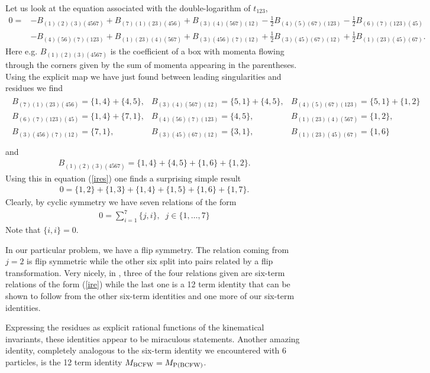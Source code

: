 \documentclass[12pt]{article}
\newcommand{\be}{\begin{eqnarray}}
\newcommand{\ee}{\end{eqnarray}}
\begin{document}
Let us look at the equation associated with the double-logarithm of $t_{123}$,
%
\begin{eqnarray}
\label{ires}
0 = & -B_{(1)(2)(3)(4567)} + B_{(7)(1)(23)(456)} + B_{(3)(4)(567)(12)} -\frac{1}{2}B_{(4)(5)(67)(123)} -\frac{1}{2}B_{(6)(7)(123)(45)} \\ & -B_{(4)(56)(7)(123)} + B_{(1)(23)(4)(567)} + B_{(3)(456)(7)(12)} +\frac{1}{2} B_{(3)(45)(67)(12)} + \frac{1}{2} B_{(1)(23)(45)(67)}. \nonumber
\end{eqnarray}
Here e.g. $B_{(1)(2)(3)(4567)}$ is the coefficient of a box with momenta flowing through the corners given by the sum of momenta appearing in the parentheses. Using the explicit map we have just found between leading singularities and residues we find
%
\be\nonumber
\begin{array}{ccc}
B_{(7)(1)(23)(456)} = \{1,4\}+\{4,5\}, & \!\!\! B_{(3)(4)(567)(12)} = \! \{5,1\}+\{4,5\}, & \!\!\! B_{(4)(5)(67)(123)} =\! \{5,1\}+\{1,2\}\\
B_{(6)(7)(123)(45)}=\{1,4\}+\{7,1\}, & B_{(4)(56)(7)(123)} = \{4,5\}, & B_{(1)(23)(4)(567)}= \{ 1,2\},\\
B_{(3)(456)(7)(12)} = \{7,1\}, & B_{(3)(45)(67)(12)} = \{3,1\}, & B_{(1)(23)(45)(67)} = \{1,6\} \\
\end{array}
\ee
and
\be
B_{(1)(2)(3)(4567)} = \{1,4\}+\{4,5\}+\{1,6\}+\{1,2\}.
\ee
Using this in equation (\ref{ires}) one finds a surprising simple result
%
\be
\label{fino}
0 = \{1,2\}+\{1,3\}+\{1,4\}+\{1,5\}+\{1,6\}+\{1,7\}.
\ee
%
Clearly, by cyclic symmetry we have seven relations of the form
%
\be
\label{ire}
0 = \sum_{i=1}^7 \{j,i\}, \;\; j\in \{1,\ldots, 7\}
\ee
%
Note that $\{i,i\}=0$.

In our particular problem, we have a flip symmetry. The relation coming from $j=2$ is flip symmetric while the other six split into pairs related by a flip transformation. Very nicely, in \cite{Bern:2004ky}, three of the four relations given are six-term relations of the form (\ref{ire}) while the last one is a 12 term identity that can be shown to follow from the other six-term identities and one more of our six-term identities.

Expressing the residues as explicit rational functions of the kinematical invariants, these identities appear to be miraculous statements. Another amazing identity, completely analogous to the six-term identity we encountered with 6 particles, is the 12 term identity $M_{{\rm BCFW}} = M_{{\rm P(BCFW)}}$.
\end{document}
